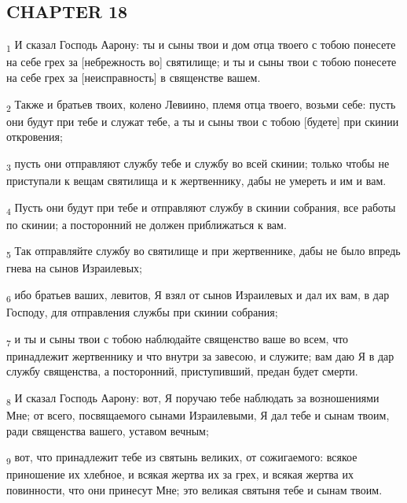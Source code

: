 \subsection{CHAPTER 18}
\begin{tcolorbox}
\textsubscript{1} И сказал Господь Аарону: ты и сыны твои и дом отца твоего с тобою понесете на себе грех за [небрежность во] святилище; и ты и сыны твои с тобою понесете на себе грех за [неисправность] в священстве вашем.
\end{tcolorbox}
\begin{tcolorbox}
\textsubscript{2} Также и братьев твоих, колено Левиино, племя отца твоего, возьми себе: пусть они будут при тебе и служат тебе, а ты и сыны твои с тобою [будете] при скинии откровения;
\end{tcolorbox}
\begin{tcolorbox}
\textsubscript{3} пусть они отправляют службу тебе и службу во всей скинии; только чтобы не приступали к вещам святилища и к жертвеннику, дабы не умереть и им и вам.
\end{tcolorbox}
\begin{tcolorbox}
\textsubscript{4} Пусть они будут при тебе и отправляют службу в скинии собрания, все работы по скинии; а посторонний не должен приближаться к вам.
\end{tcolorbox}
\begin{tcolorbox}
\textsubscript{5} Так отправляйте службу во святилище и при жертвеннике, дабы не было впредь гнева на сынов Израилевых;
\end{tcolorbox}
\begin{tcolorbox}
\textsubscript{6} ибо братьев ваших, левитов, Я взял от сынов Израилевых и дал их вам, в дар Господу, для отправления службы при скинии собрания;
\end{tcolorbox}
\begin{tcolorbox}
\textsubscript{7} и ты и сыны твои с тобою наблюдайте священство ваше во всем, что принадлежит жертвеннику и что внутри за завесою, и служите; вам даю Я в дар службу священства, а посторонний, приступивший, предан будет смерти.
\end{tcolorbox}
\begin{tcolorbox}
\textsubscript{8} И сказал Господь Аарону: вот, Я поручаю тебе наблюдать за возношениями Мне; от всего, посвящаемого сынами Израилевыми, Я дал тебе и сынам твоим, ради священства вашего, уставом вечным;
\end{tcolorbox}
\begin{tcolorbox}
\textsubscript{9} вот, что принадлежит тебе из святынь великих, от сожигаемого: всякое приношение их хлебное, и всякая жертва их за грех, и всякая жертва их повинности, что они принесут Мне; это великая святыня тебе и сынам твоим.
\end{tcolorbox}
